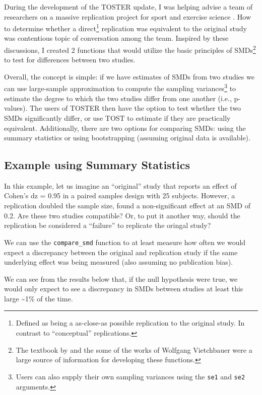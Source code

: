 \documentclass[]{interact}
\theoremstyle{plain}%
\theoremstyle{definition}
\theoremstyle{remark}
\begin{document}
During the development of the TOSTER update, I was helping advise a team
of researchers on a massive replication project for sport and exercise
science \citep{repSES}. How to determine whether a direct\footnote{Defined
  as being a as-close-as possible replication to the original study. In
  contrast to ``conceptual'' replications.} replication was equivalent
to the original study was contentious topic of conversation among the
team. Inspired by these discussions, I created 2 functions that would
utilize the basic principles of SMDs\footnote{The textbook by
  \citet{borenstein} and the some of the works of Wolfgang Vietchbauer
  were a large source of information for developing these functions.} to
test for differences between two studies.

Overall, the concept is simple: if we have estimates of SMDs from two
studies we can use large-sample approximation to compute the sampling
variances\footnote{Users can also supply their own sampling variances
  using the \texttt{se1} and \texttt{se2} arguments.} to estimate the
degree to which the two studies differ from one another (i.e.,
p-values). The users of TOSTER then have the option to test whether the
two SMDs significantly differ, or use TOST to estimate if they are
practically equivalent. Additionally, there are two options for
comparing SMDs: using the summary statistics or using bootstrapping
(assuming original data is available).

\hypertarget{example-using-summary-statistics}{%
\subsection{Example using Summary
Statistics}\label{example-using-summary-statistics}}

In this example, let us imagine an ``original'' study that reports an
effect of Cohen's dz = 0.95 in a paired samples design with 25 subjects.
However, a replication doubled the sample size, found a non-significant
effect at an SMD of 0.2. Are these two studies compatible? Or, to put it
another way, should the replication be considered a ``failure'' to
replicate the oringal study?

We can use the \texttt{compare\_smd} function to at least measure how
often we would expect a discrepancy between the original and replication
study if the same underlying effect was being measured (also assuming no
publication bias).

We can see from the results below that, if the null hypothesis were
true, we would only expect to see a discrepancy in SMDs between studies
at least this large \textasciitilde1\% of the time.
\end{document}
